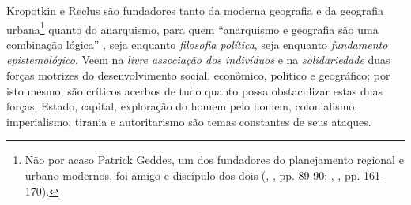 
Kropotkin e Reclus são fundadores tanto da moderna geografia e da geografia urbana\footnote{Não por acaso Patrick Geddes, um dos fundadores do planejamento regional e urbano modernos, foi amigo e discípulo dos dois (\citeauthor{dunbar_elisee_1989}, \citeyear{dunbar_elisee_1989}, pp. 89-90; \citeauthor{hall_cidades_2007}, \citeyear{hall_cidades_2007}, pp. 161-170).} quanto do anarquismo, para quem ``anarquismo e geografia são uma combinação lógica'' \cite[p.~78]{dunbar_elisee_1989}, seja enquanto \textit{filosofia política}, seja enquanto \textit{fundamento epistemológico}. Veem na \textit{livre associação dos indivíduos} e na \textit{solidariedade} duas forças motrizes do desenvolvimento social, econômico, político e geográfico; por isto mesmo, são críticos acerbos de tudo quanto possa obstaculizar estas duas forças: Estado, capital, exploração do homem pelo homem, colonialismo, imperialismo, tirania e autoritarismo são temas constantes de seus ataques.

